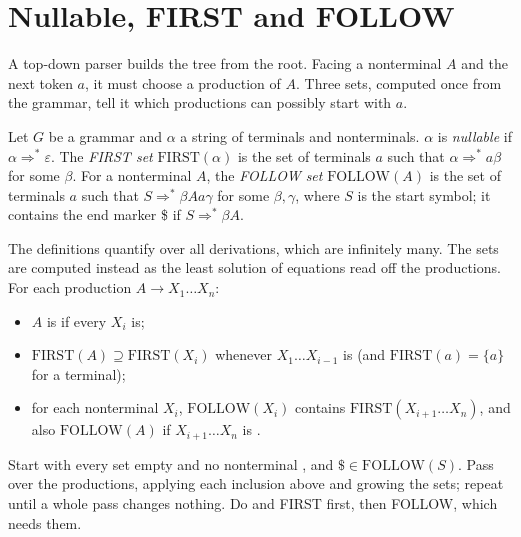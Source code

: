 \label{lst:b3:top-down-parsing:ast}

\section{Nullable, FIRST and FOLLOW}\label{sec:b3:top-down-parsing:first-follow}

A top-down parser builds the tree from the root. Facing a nonterminal $A$ and the next token $a$, it must choose a production of $A$. Three sets, computed once from the grammar, tell it which productions can possibly start with $a$.

\begin{definition}\label{def:b3:top-down-parsing:first-follow}
Let $G$ be a grammar and $\alpha$ a string of terminals and nonterminals. $\alpha$ is \emph{nullable} if $\alpha \Rightarrow^* \varepsilon$. The \emph{FIRST set} $\mathrm{FIRST}(\alpha)$ is the set of terminals $a$ such that $\alpha \Rightarrow^* a\beta$ for some $\beta$. For a nonterminal $A$, the \emph{FOLLOW set} $\mathrm{FOLLOW}(A)$ is the set of terminals $a$ such that $S \Rightarrow^* \beta A a \gamma$ for some $\beta, \gamma$, where $S$ is the start symbol; it contains the end marker \$ if $S \Rightarrow^* \beta A$.
\end{definition}

The definitions quantify over all derivations, which are infinitely many. The sets are computed instead as the least solution of equations read off the productions. For each production $A \to X_1 \dots X_n$:
\begin{itemize}
\item $A$ is  if every $X_i$ is;
\item $\mathrm{FIRST}(A) \supseteq \mathrm{FIRST}(X_i)$ whenever $X_1 \dots X_{i-1}$ is  (and $\mathrm{FIRST}(a) = \{a\}$ for a terminal);
\item for each nonterminal $X_i$, $\mathrm{FOLLOW}(X_i)$ contains $\mathrm{FIRST}(X_{i+1} \dots X_n)$, and also $\mathrm{FOLLOW}(A)$ if $X_{i+1} \dots X_n$ is .
\end{itemize}

\begin{method}\label{met:b3:top-down-parsing:iterate}
Start with every set empty and no nonterminal , and $\$ \in \mathrm{FOLLOW}(S)$. Pass over the productions, applying each inclusion above and growing the sets; repeat until a whole pass changes nothing. Do  and FIRST first, then FOLLOW, which needs them.
\end{method}

